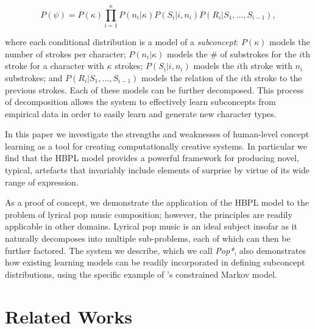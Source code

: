 \documentclass[letterpaper]{article}
\begin{document}
\begin{equation} \label{eq:1}
P(\psi) = P(\kappa) \prod_{i=1}^{\kappa} P(n_i|\kappa)P(S_i|i,n_i)P(R_i|S_1, ..., S_{i-1}),
\end{equation}

\noindent where each conditional distribution is a model of a \textit{subconcept}: \( P(\kappa) \) models the number of strokes per character; \( P(n_i|\kappa) \) models the \# of substrokes for the $i$th stroke for a character with $\kappa$ strokes; \( P(S_i|i,n_i) \) models the $i$th stroke with $n_i$ substrokes; and \( P(R_i|S_1, ..., S_{i-1}) \) models the relation of the $i$th stroke to the previous strokes. Each of these models can be further decomposed. This process of decomposition allows the system to effectively learn subconcepts from empirical data in order to easily learn and generate new character types.

In this paper we investigate the strengths and weaknesses of human-level concept learning as a tool for creating computationally creative systems. In particular we find that the HBPL model provides a powerful framework for producing novel, typical, artefacts that invariably include elements of surprise by virtue of its wide range of expression.

As a proof of concept, we demonstrate the application of the HBPL model to the problem of lyrical pop music composition; however, the principles are readily applicable in other domains. Lyrical pop music is an ideal subject insofar as it naturally decomposes into multiple sub-problems, each of which can then be further factored. The system we describe, which we call \textit{Pop*}, also demonstrates how existing learning models can be readily incorporated in defining subconcept distributions, using the specific example of \cite{pachet2001finite}'s constrained Markov model.

\section{Related Works}

\end{document}
